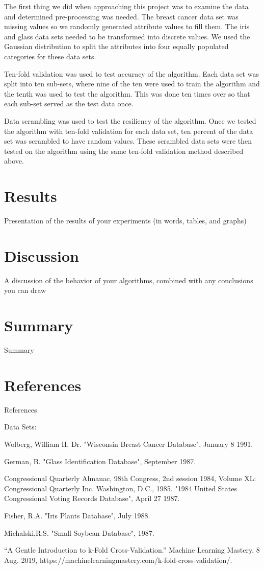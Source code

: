 \documentclass{article}
\begin{document}
The first thing we did when approaching this project was to examine the data and determined pre-processing was needed. The breast cancer data set was missing values so we randomly generated attribute values to fill them. The iris and glass data sets needed to be transformed into discrete values. We used the Gaussian distribution to split the attributes into four equally populated categories for these data sets.

Ten-fold validation was used to test accuracy of the algorithm.  Each data set was split into ten sub-sets, where nine of the ten were used to train the algorithm and the tenth was used to test the algorithm. This was done ten times over so that each sub-set served as the test data once. 

Data scrambling was used to test the resiliency of the algorithm. Once we tested the algorithm with ten-fold validation for each data set, ten percent of the data set was scrambled to have random values. These scrambled data sets were then tested on the algorithm using the same ten-fold validation method described above.  

\section{Results}

Presentation of the results of your experiments (in words, tables, and graphs)

\section{Discussion}

A discussion of the behavior of your algorithms, combined with any conclusions you can draw

\section{Summary}

Summary

\section{References}

References

Data Sets:

Wolberg, William H. Dr. "Wisconsin Breast Cancer Database", January 8 1991.

German, B. "Glass Identification Database", September 1987.

Congressional Quarterly Almanac, 98th Congress, 2nd session 1984, Volume XL: Congressional Quarterly Inc. Washington, D.C., 1985. "1984 United States Congressional Voting Records Database", April 27 1987.

Fisher, R.A. "Iris Plants Database", July 1988.

Michalski,R.S. "Small Soybean Database", 1987.

“A Gentle Introduction to k-Fold Cross-Validation.” Machine Learning Mastery, 8 Aug. 2019, https://machinelearningmastery.com/k-fold-cross-validation/.
\end{document}
